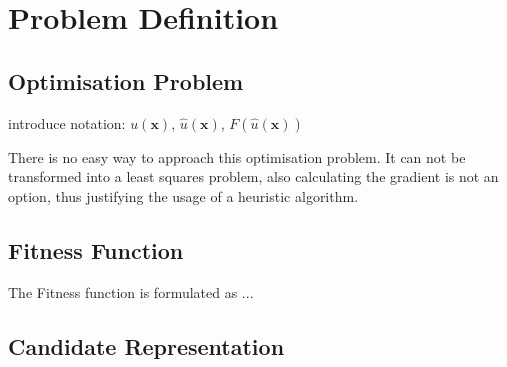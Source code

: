 \documentclass[./\jobname.tex]{subfiles}
\begin{document}
\chapter{Problem Definition}

\section{Optimisation Problem}
\label{chap:opt_problem}

introduce notation: $u(\mathbf{x})$, $\hat{u}(\mathbf{x})$, $F(\hat{u}(\mathbf{x}))$

There is no easy way to approach this optimisation problem. It can not be transformed into a least squares problem, also calculating the gradient is not an option, thus justifying the usage of a heuristic algorithm.  

\section{Fitness Function}
The Fitness function is formulated as ... 


\section{Candidate Representation}
\end{document}
